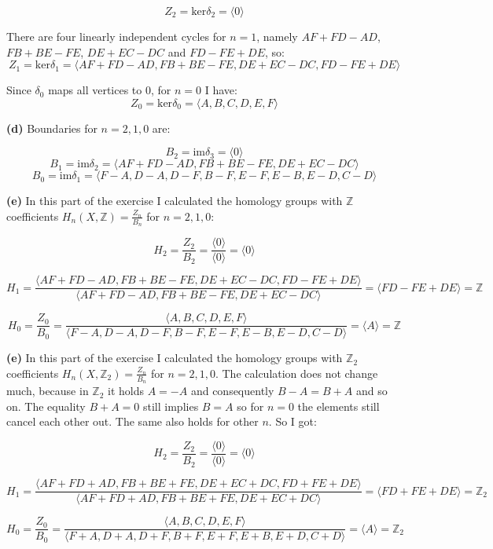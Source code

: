 \documentclass[12pt]{article}
\begin{document}
	$$Z_2 = \text{ker}\delta_2 = \langle 0 \rangle $$
	
	There are four linearly independent cycles for $n=1$, namely $AF + FD - AD$, $FB + BE - FE$, $DE + EC - DC$ and $FD - FE + DE$, so: 
	$$Z_1 = \text{ker}\delta_1 = \langle AF + FD - AD, FB + BE - FE, DE + EC - DC,
	FD - FE + DE  \rangle $$
	
	Since $\delta_0$ maps all vertices to 0, for $n=0$ I have: 
	$$Z_0 = \text{ker}\delta_0 = \langle A, B, C, D, E, F \rangle$$
	
	
	\textbf{(d)} Boundaries for $n=2,1,0$ are:
	
	$$B_2 = \text{im} \delta_3 = \langle 0 \rangle$$
	$$B_1 = \text{im} \delta_2 = \langle AF + FD - AD, FB + BE - FE, DE + EC - DC \rangle$$
	$$B_0 = \text{im} \delta_1 = \langle F-A,D-A,D-F,B-F,E-F,E-B,E-D,C-D \rangle $$
	
	\textbf{(e)} In this part of the exercise I calculated the homology groups with $\mathbb{Z}$ coefficients $H_n(X,\mathbb{Z})=\frac{Z_n}{B_n}$ for $n=2,1,0$:
	
	$$H_2=\frac{Z_2}{B_2}=\frac{\langle 0 \rangle}{\langle 0 \rangle}=\langle 0 \rangle$$
	
	$$H_1=\frac{\langle AF + FD - AD, FB + BE - FE, DE + EC - DC,
		FD - FE + DE  \rangle}{\langle AF + FD - AD, FB + BE - FE, DE + EC - DC \rangle} = \langle FD - FE + DE \rangle = \mathbb{Z}$$
	
	$$H_0=\frac{Z_0}{B_0}=\frac{\langle A, B, C, D, E, F \rangle}{\langle F-A,D-A,D-F,B-F,E-F,E-B,E-D,C-D \rangle}= \langle A \rangle = \mathbb{Z}$$
	
	
	\textbf{(e)} In this part of the exercise I calculated the homology groups with $\mathbb{Z}_2$ coefficients $H_n(X,\mathbb{Z}_2)=\frac{Z_n}{B_n}$ for $n=2,1,0$. The calculation does not change much, because in $\mathbb{Z}_2$ it holds $A=-A$ and consequently $B-A=B+A$ and so on. The equality $B+A=0$ still implies $B=A$ so for $n=0$ the elements still cancel each other out. The same also holds for other $n$. So I got: 
	
	$$H_2=\frac{Z_2}{B_2}=\frac{\langle 0 \rangle}{\langle 0 \rangle}=\langle 0 \rangle$$
	
	$$H_1=\frac{\langle AF + FD + AD, FB + BE + FE, DE + EC + DC,
		FD + FE + DE  \rangle}{\langle AF + FD + AD, FB + BE + FE, DE + EC + DC \rangle} = \langle FD + FE + DE \rangle = \mathbb{Z}_2$$
	
	$$H_0=\frac{Z_0}{B_0}=\frac{\langle A, B, C, D, E, F \rangle}{\langle F+A,D+A,D+F,B+F,E+F,E+B,E+D,C+D \rangle}= \langle A \rangle = \mathbb{Z}_2$$
	
\end{document}
